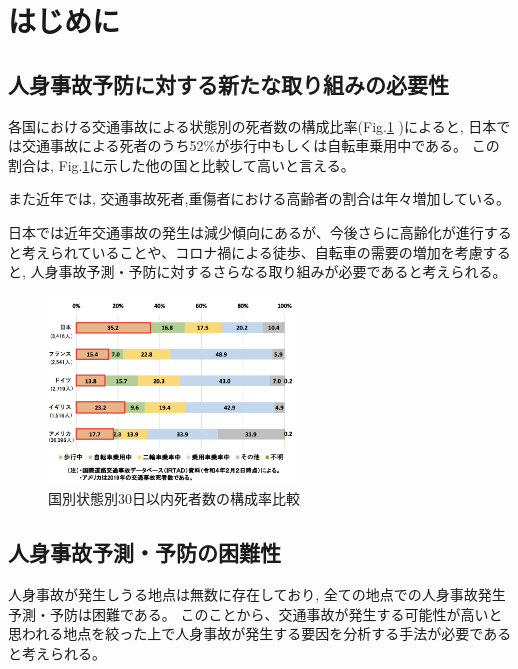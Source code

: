 \documentclass[a4j,8.5pt, twocolumn,fleqn]{jbook}
\begin{document}
\Atitle
\small
\vspace*{-2mm}


\section{はじめに}
\subsection{人身事故予防に対する新たな取り組みの必要性}
各国における交通事故による状態別の死者数の構成比率(Fig.\ref{国別状態別30日以内死者数の構成率比較}
)によると, 日本では交通事故による死者のうち52\%が歩行中もしくは自転車乗用中である。
この割合は, Fig.\ref{国別状態別30日以内死者数の構成率比較}に示した他の国と比較して高いと言える。

また近年では, 交通事故死者,重傷者における高齢者の割合は年々増加している\cite{令和3年における交通事故の発生状況等について}。

日本では近年交通事故の発生は減少傾向にあるが、今後さらに高齢化が進行すると考えられていることや、コロナ禍による徒歩、自転車の需要の増加\cite{自転車を巡る現状等}を考慮すると, 人身事故予測・予防に対するさらなる取り組みが必要であると考えられる。

\begin{figure}[htb]
    \centering
    \includegraphics[height=50mm]{images/shibou_status.png}
    \vspace{-3mm}
    \caption{国別状態別30日以内死者数の構成率比較\cite{令和3年における交通事故の発生状況等について}}
    \label{国別状態別30日以内死者数の構成率比較}
\end{figure}

\subsection{人身事故予測・予防の困難性}
人身事故が発生しうる地点は無数に存在しており, 全ての地点での人身事故発生予測・予防は困難である。
このことから、交通事故が発生する可能性が高いと思われる地点を絞った上で人身事故が発生する要因を分析する手法が必要であると考えられる。
\end{document}
